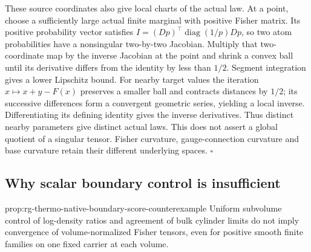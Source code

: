 These source coordinates also give local charts of the actual law. At a
point, choose a sufficiently large actual finite marginal with positive
Fisher matrix. Its positive probability vector satisfies
\(I=(Dp)^\top\operatorname{diag}(1/p)Dp\), so two atom probabilities
have a nonsingular two-by-two Jacobian. Multiply that two-coordinate map
by the inverse Jacobian at the point and shrink a convex ball until its
derivative differs from the identity by less than \(1/2\). Segment
integration gives a lower Lipschitz bound. For nearby target values the
iteration \(x\mapsto x+y-F(x)\) preserves a smaller ball and contracts
distances by \(1/2\); its successive differences form a convergent
geometric series, yielding a local inverse. Differentiating its defining
identity gives the inverse derivatives. Thus distinct nearby parameters
give distinct actual laws. This does not assert a global quotient of a
singular tensor. Fisher curvature, gauge-connection curvature and base
curvature retain their different underlying spaces. \hfill\(\square\)

\subsection{Why scalar boundary control is insufficient}
\label{sec:rg-thermo-native-boundary-obstruction}

{prop:rg-thermo-native-boundary-score-counterexample}
Uniform subvolume control of log-density ratios and agreement of bulk
cylinder limits do not imply convergence of volume-normalized Fisher
tensors, even for positive smooth finite families on one fixed carrier
at each volume.\thermoestablishedstatus


